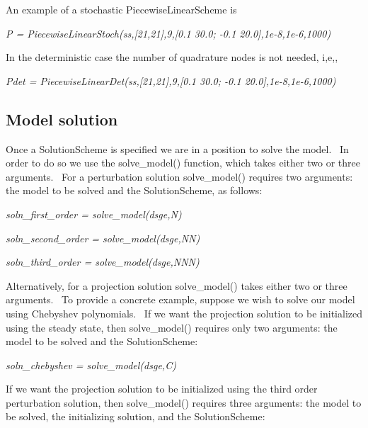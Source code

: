 \documentclass[notitlepage,11pt]{article}
\begin{document}
\bigskip

An example of a stochastic PiecewiseLinearScheme is

\bigskip

\textit{P = PiecewiseLinearStoch(ss,[21,21],9,[0.1 30.0; -0.1
20.0],1e-8,1e-6,1000)}

\bigskip

In the deterministic case the number of quadrature nodes is not needed, i,e,,

\bigskip

\textit{Pdet = PiecewiseLinearDet(ss,[21,21],9,[0.1 30.0; -0.1
20.0],1e-8,1e-6,1000)}

\subsection{Model solution}

Once a SolutionScheme is specified we are in a position to solve the model.
\ In order to do so we use the solve\_model() function, which takes either
two or three arguments. \ For a perturbation solution solve\_model()
requires two arguments: the model to be solved and the SolutionScheme, as
follows:

\bigskip

\textit{soln\_first\_order = solve\_model(dsge,N)}

\bigskip

\textit{soln\_second\_order = solve\_model(dsge,NN)}

\bigskip

\textit{soln\_third\_order = solve\_model(dsge,NNN)}

\bigskip

Alternatively, for a projection solution solve\_model() takes either two or
three arguments. \ To provide a concrete example, suppose we wish to solve
our model using Chebyshev polynomials. \ If we want the projection solution
to be initialized using the steady state, then solve\_model() requires only
two arguments: the model to be solved and the SolutionScheme:

\bigskip

\textit{soln\_chebyshev = solve\_model(dsge,C)}

\bigskip

If we want the projection solution to be initialized using the third order
perturbation solution, then solve\_model() requires three arguments: the
model to be solved, the initializing solution, and the SolutionScheme:

\bigskip
\end{document}
